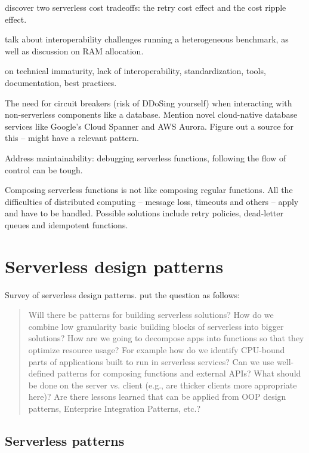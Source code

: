 \documentclass[utf8,english]{gradu3}
\begin{document}
\textcite{kuhlenkamp17costradamus} discover two serverless cost tradeoffs: the retry cost effect and the cost ripple effect.

\textcite{malawski18benchmark} talk about interoperability challenges running a heterogeneous benchmark, as well as discussion on RAM allocation.

\textcite{cncf18serverlessWG} on technical immaturity, lack of interoperability, standardization, tools, documentation, best practices.

The need for circuit breakers (risk of DDoSing yourself) when interacting with non-serverless components like a database. Mention novel cloud-native database services like Google's Cloud Spanner and AWS Aurora. Figure out a source for this -- \textcite{hohpe2004enterprise} might have a relevant pattern.

Address maintainability: debugging serverless functions, following the flow of control can be tough.

Composing serverless functions is not like composing regular functions. All the difficulties of distributed computing -- message loss, timeouts and others -- apply and have to be handled. Possible solutions include retry policies, dead-letter queues and idempotent functions.

\chapter{Serverless design patterns}

Survey of serverless design patterns. \textcite{baldini17currentTrends} put the question as follows:

\begin{quote}
Will there be patterns for building serverless solutions? How do we combine low granularity basic building blocks of serverless into bigger solutions? How are we going to decompose apps into functions so that they optimize resource usage? For example how do we identify CPU-bound parts of applications built to run in serverless services? Can we use well-defined patterns for composing functions and external APIs? What should be done on the server vs. client (e.g., are thicker clients more appropriate here)? Are there lessons learned that can be applied from OOP design patterns, Enterprise Integration Patterns, etc.?
\end{quote}

\section{Serverless patterns}
\end{document}
